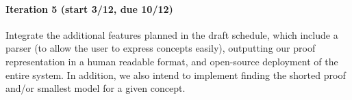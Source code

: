 \paragraph{Iteration 5 (start 3/12, due 10/12)} Integrate the additional features planned in the draft schedule, which include a parser (to allow the user to express concepts easily), outputting our proof representation in a human readable format, and open-source deployment of the entire system. In addition, we also intend to implement finding the shorted proof and/or smallest model for a given concept.
